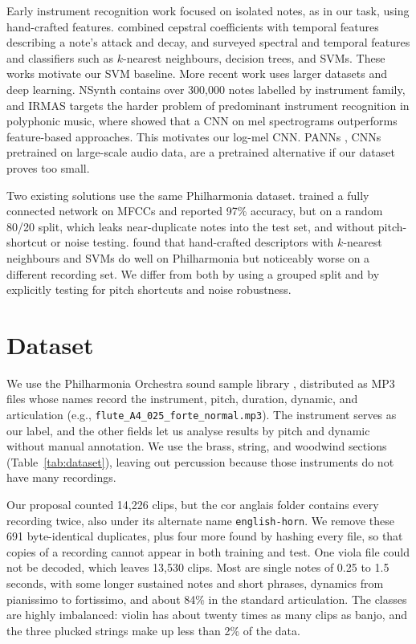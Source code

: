 \documentclass[11pt]{article}
\begin{document}
Early instrument recognition work focused on isolated notes, as in our task, using hand-crafted features. \citet{eronen2000musical} combined cepstral coefficients with temporal features describing a note's attack and decay, and \citet{herrera2003automatic} surveyed spectral and temporal features and classifiers such as $k$-nearest neighbours, decision trees, and SVMs. These works motivate our SVM baseline. More recent work uses larger datasets and deep learning. NSynth \citep{engel2017nsynth} contains over 300,000 notes labelled by instrument family, and IRMAS \citep{bosch2012irmas} targets the harder problem of predominant instrument recognition in polyphonic music, where \citet{han2017deep} showed that a CNN on mel spectrograms outperforms feature-based approaches. This motivates our log-mel CNN. PANNs \citep{kong2020panns}, CNNs pretrained on large-scale audio data, are a pretrained alternative if our dataset proves too small.

Two existing solutions use the same Philharmonia dataset. \citet{mahanta2021deep} trained a fully connected network on MFCCs and reported 97\% accuracy, but on a random 80/20 split, which leaks near-duplicate notes into the test set, and without pitch-shortcut or noise testing. \citet{siebert2016robustness} found that hand-crafted descriptors with $k$-nearest neighbours and SVMs do well on Philharmonia but noticeably worse on a different recording set. We differ from both by using a grouped split and by explicitly testing for pitch shortcuts and noise robustness.

\section{Dataset}

We use the Philharmonia Orchestra sound sample library \citep{philharmonia_samples}, distributed as MP3 files whose names record the instrument, pitch, duration, dynamic, and articulation (e.g., \texttt{flute\_A4\_025\_forte\_normal.mp3}). The instrument serves as our label, and the other fields let us analyse results by pitch and dynamic without manual annotation. We use the brass, string, and woodwind sections (Table~\ref{tab:dataset}), leaving out percussion because those instruments do not have many recordings.

Our proposal counted 14,226 clips, but the cor anglais folder contains every recording twice, also under its alternate name \texttt{english-horn}. We remove these 691 byte-identical duplicates, plus four more found by hashing every file, so that copies of a recording cannot appear in both training and test. One viola file could not be decoded, which leaves 13,530 clips. Most are single notes of 0.25 to 1.5 seconds, with some longer sustained notes and short phrases, dynamics from pianissimo to fortissimo, and about 84\% in the standard articulation. The classes are highly imbalanced: violin has about twenty times as many clips as banjo, and the three plucked strings make up less than 2\% of the data.
\end{document}
